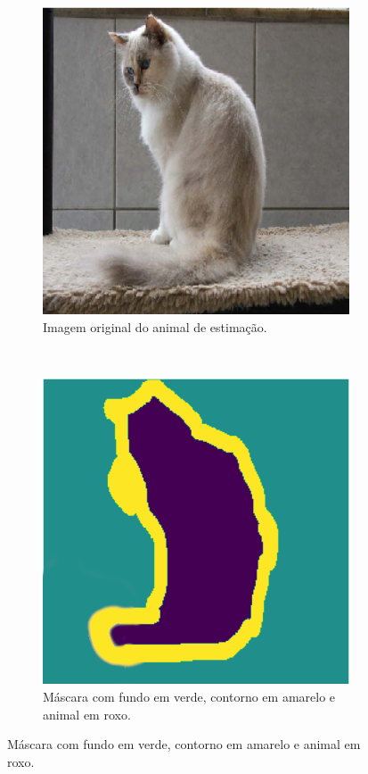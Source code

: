 \begin{figure}[H]
   \centering
   \caption{Exemplo de amostra com máscara de características.}
   \label{project:fig:dataset:pets_1}
    \begin{subfigure}[t]{0.45\textwidth}
        \centering
        \includegraphics[width=1\linewidth]{recursos/imagens/project/pets_ori.png}
        \caption{Imagem original do animal de estimação.}
        \label{project:fig:dataset:pets_1.1}
    \end{subfigure}%
    ~ 
    \begin{subfigure}[t]{0.45\textwidth}
        \centering
        \includegraphics[width=1\linewidth]{recursos/imagens/project/pets_mask.png}
        \caption{Máscara com fundo em verde, contorno em amarelo e animal em roxo.}
        \label{project:fig:dataset:pets_1.2}
    \end{subfigure}%


\end{figure}
